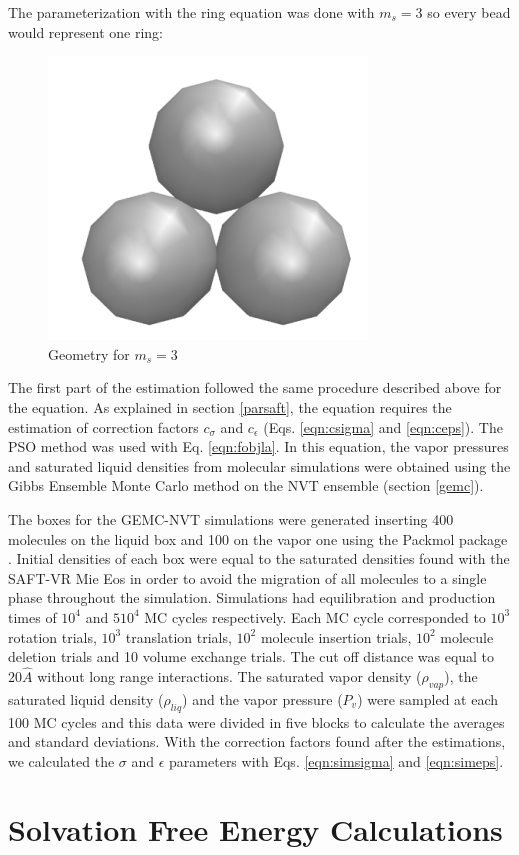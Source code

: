 The parameterization with the  ring equation was done with $m_{s}=3$ so every bead would represent one ring:

\begin{figure}[th]
	\centering
	\includegraphics[width=0.15\linewidth]{Figures/fe3}
	\caption{Geometry for $m_{s}=3$}
	\label{fig:fen3}
\end{figure}

The first part of the estimation followed the same procedure described above for the  equation. As explained in section \ref{parsaft}, the  equation requires the estimation of correction factors $c_{\sigma}$ and $c_{\epsilon}$ (Eqs. \eqref{eqn:csigma} and \eqref{eqn:ceps}). The PSO method was used with Eq. \eqref{eqn:fobjla}. In this equation, the vapor pressures and saturated liquid densities from molecular simulations were obtained using the Gibbs Ensemble Monte Carlo method on the NVT ensemble  (section \ref{gemc}).

The boxes for the GEMC-NVT simulations were generated inserting 400 molecules on the liquid box and 100 on the vapor one using the Packmol package \cite{packmol}. Initial densities of each box were equal to the saturated densities found with the SAFT-VR Mie Eos in order to avoid the migration of all molecules to a single phase throughout the simulation.  Simulations had equilibration and production times of $10^{4}$ and $5 10^{4}$ MC cycles respectively. Each MC cycle corresponded to $10^3$ rotation trials, $10^3$ translation trials, $10^2$ molecule insertion trials, $10^2$ molecule deletion trials and 10 volume exchange trials. The cut off distance was equal to $20 \hat{A}$ without long range interactions. The saturated vapor density ($\rho_{vap}$), the saturated liquid density ($\rho_{liq}$) and the vapor pressure ($P_{v}$) were sampled at each 100 MC cycles and this data were divided in five blocks to calculate the averages and standard deviations. With the correction factors found after the estimations, we calculated the $\sigma$ and $\epsilon$ parameters with Eqs. \eqref{eqn:simsigma} and \eqref{eqn:simeps}.


\section{Solvation Free Energy Calculations}\label{solvme}

